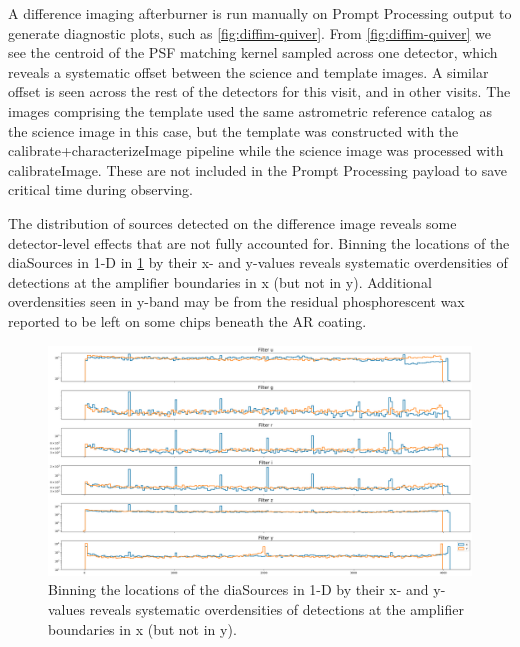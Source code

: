 A difference imaging afterburner is run manually on Prompt Processing output to generate diagnostic plots, such as \ref{fig:diffim-quiver}.
From \ref{fig:diffim-quiver} we see the centroid of the PSF matching kernel sampled across one detector, which reveals a systematic offset between the science and template images.
A similar offset is seen across the rest of the detectors for this visit, and in other visits.
The images comprising the template used the same astrometric reference catalog as the science image in this case, but the template was constructed with the calibrate+characterizeImage pipeline while the science image was processed with calibrateImage.
These are not included in the Prompt Processing payload to save critical time during observing.

The distribution of sources detected on the difference image reveals some detector-level effects that are not fully accounted for.
Binning the locations of the diaSources in 1-D in \ref{fig:diaSource-distribution} by their x- and y-values reveals systematic overdensities of detections at the amplifier boundaries in x (but not in y).
Additional overdensities seen in y-band may be from the residual phosphorescent wax reported to be left on some chips beneath the AR coating.

\begin{figure}
\includegraphics[width=\textwidth]{dia/figures/diaSource_distribution.png}
\caption{Binning the locations of the diaSources in 1-D by their x- and y-values reveals systematic overdensities of detections at the amplifier boundaries in x (but not in y). \label{fig:diaSource-distribution}}
\end{figure}








